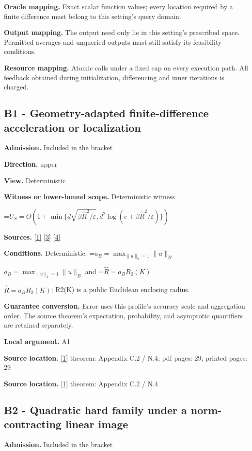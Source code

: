\documentclass[10pt,a4paper]{article}
\newcommand{\AtlasMath}[1]{\par\begingroup\centering\setbox0=\hbox{$\displaystyle #1$}\ifdim\wd0>1.4\linewidth\typeout{ATLAS WIDE FORMULA: \the\wd0}\fi\ifdim\wd0>\linewidth\resizebox{\linewidth}{!}{\box0}\else\box0\fi\par\endgroup}
\newcommand{\AtlasInlineMath}[1]{\begingroup\setbox0=\hbox{$#1$}\ifdim\wd0>.4\linewidth\endgroup\AtlasMath{#1}\else\endgroup$#1$\fi}
\begin{document}
\textbf{Oracle mapping.} Exact scalar function values; every location required by a finite difference must belong to this setting's query domain.

\textbf{Output mapping.} The output need only lie in this setting's prescribed space. Permitted averages and unqueried outputs must still satisfy its feasibility conditions.

\textbf{Resource mapping.} Atomic calls under a fixed cap on every execution path. All feedback obtained during initialization, differencing and inner iterations is charged.

\subsection{B1 - Geometry-adapted finite-difference acceleration or localization}
\textbf{Admission.} Included in the bracket

\textbf{Direction.} upper

\textbf{View.} Deterministic

\textbf{Witness or lower-bound scope.} Deterministic witness

\AtlasMath{U_S=O(1+\min\{d\sqrt{\beta\widehat{R}^2/\varepsilon},d^2\log(e+\beta\widehat{R}^2/\varepsilon)\})}
\textbf{Sources.} \href{https://arxiv.org/html/2610.00345v1}{[1]} \href{https://arxiv.org/html/2607.16558v2}{[3]} \href{https://www.mathnet.ru/php/archive.phtml?jrnid=mzm&option_lang=eng&paperid=1697&wshow=paper}{[4]}

\textbf{Conditions.} Deterministic; \AtlasInlineMath{a_B=\max_{\|u\|_2=1}\|u\|_B} and \AtlasInlineMath{\widehat{R}=a_BR_2(K)}; R2(K) is a public Euclidean enclosing radius.

\textbf{Guarantee conversion.} Error uses this profile's accuracy scale and aggregation order. The source theorem's expectation, probability, and asymptotic quantifiers are retained separately.

\textbf{Local argument.} A1

\textbf{Source location.} \href{https://arxiv.org/html/2610.00345v1}{[1]} theorem: Appendix C.2 / N.4; pdf pages: 29; printed pages: 29

\textbf{Source location.} \href{https://arxiv.org/html/2610.00345v1}{[1]} theorem: Appendix C.2 / N.4

\subsection{B2 - Quadratic hard family under a norm-contracting linear image}
\textbf{Admission.} Included in the bracket
\end{document}
